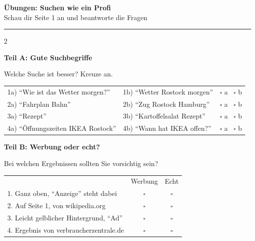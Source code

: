 \documentclass[a4paper,landscape,8pt]{extarticle}
\begin{document}
\newpage


\begin{center}
{\LARGE\bfseries Übungen: Suchen wie ein Profi}\\[3pt]
{\normalsize Schau dir Seite 1 an und beantworte die Fragen}
\end{center}

\vspace{3mm}
\hrule
\vspace{4mm}

\begin{multicols}{2}

\textbf{\large Teil A: Gute Suchbegriffe}

Welche Suche ist besser? Kreuze an.

\vspace{2mm}

\renewcommand{\arraystretch}{1.8}
\begin{tabular}{@{}p{6cm}p{6cm}c@{}}
1a) ``Wie ist das Wetter morgen?'' & 1b) ``Wetter Rostock morgen'' & $\square$ a ~$\square$ b \\
2a) ``Fahrplan Bahn'' & 2b) ``Zug Rostock Hamburg'' & $\square$ a ~$\square$ b \\
3a) ``Rezept'' & 3b) ``Kartoffelsalat Rezept'' & $\square$ a ~$\square$ b \\
4a) ``Öffnungszeiten IKEA Rostock'' & 4b) ``Wann hat IKEA offen?'' & $\square$ a ~$\square$ b \\
\end{tabular}
\renewcommand{\arraystretch}{1}

\vspace{6mm}

\textbf{\large Teil B: Werbung oder echt?}

Bei welchen Ergebnissen sollten Sie vorsichtig sein?

\vspace{2mm}

\renewcommand{\arraystretch}{1.6}
\begin{tabular}{@{}p{8cm}cc@{}}
& Werbung & Echt \\
1. Ganz oben, ``Anzeige'' steht dabei & $\square$ & $\square$ \\
2. Auf Seite 1, von wikipedia.org & $\square$ & $\square$ \\
3. Leicht gelblicher Hintergrund, ``Ad'' & $\square$ & $\square$ \\
4. Ergebnis von verbraucherzentrale.de & $\square$ & $\square$ \\
\end{tabular}
\renewcommand{\arraystretch}{1}


\end{multicols}
\end{document}

